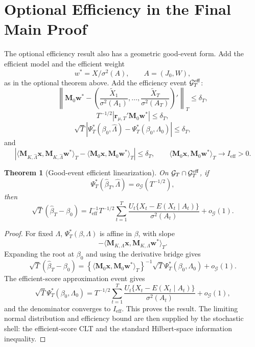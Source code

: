 \documentclass[12pt]{article}
\numberwithin{equation}{section}
\newtheorem{theorem}{Theorem}
\theoremstyle{definition}
\newcommand{\innerT}[2]{\langle #1,#2\rangle_T}
\begin{document}
\section{Optional Efficiency in the Final Main Proof}

The optional efficiency result also has a geometric good-event form. Add the
efficient model and the efficient weight
\[
    w^*=X/\sigma^2(A),
    \qquad A=(J_0,W),
\]
as in the optional theorem above. Add the efficiency event \(\mathcal G_T^{\rm eff}\):
\[
    \left\|\bm M_0\bm w^*-
    \left(\frac{\widetilde X_1}{\sigma^2(A_1)},\ldots,
          \frac{\widetilde X_T}{\sigma^2(A_T)}\right)'\right\|_T
    \le\delta_T,
\]
\[
    T^{-1/2}|\bm r_{\mu,T}'\bm M_0\bm w^*|\le\delta_T,
\]
\[
    \sqrt T|\Psi_T^*(\beta_0,\widehat\Lambda)
      -\Psi_T^*(\beta_0,\Lambda_0)|\le\delta_T,
\]
and
\[
    \left|\innerT{\bm M_{K,\widehat\Lambda}\bm x}
      {\bm M_{K,\widehat\Lambda}\bm w^*}
      -\innerT{\bm M_0\bm x}{\bm M_0\bm w^*}\right|\le\delta_T,
    \qquad
    \innerT{\bm M_0\bm x}{\bm M_0\bm w^*}\to I_{\mathrm{eff}}>0.
\]

\begin{theorem}[Good-event efficient linearization]
\label{thm:v2-good-event-efficiency}
On \(\mathcal G_T\cap\mathcal G_T^{\rm eff}\), if
\[
    \Psi_T^*(\widehat\beta_T,\widehat\Lambda)=o_{\mathcal G}(T^{-1/2}),
\]
then
\[
    \sqrt T(\widehat\beta_T-\beta_0)
    =I_{\mathrm{eff}}^{-1}
      T^{-1/2}\sum_{t=1}^T
      \frac{U_t\{X_t-E(X_t\mid A_t)\}}{\sigma^2(A_t)}
      +o_{\mathcal G}(1).
\]
\end{theorem}

\begin{proof}
For fixed \(\Lambda\), \(\Psi_T^*(\beta,\Lambda)\) is affine in \(\beta\), with
slope
\[
    -\innerT{\bm M_{K,\Lambda}\bm x}{\bm M_{K,\Lambda}\bm w^*}.
\]
Expanding the root at \(\beta_0\) and using the derivative bridge gives
\[
    \sqrt T(\widehat\beta_T-\beta_0)
    =\left\{\innerT{\bm M_0\bm x}{\bm M_0\bm w^*}\right\}^{-1}
      \sqrt T\Psi_T^*(\beta_0,\Lambda_0)+o_{\mathcal G}(1).
\]
The efficient-score approximation event gives
\[
    \sqrt T\Psi_T^*(\beta_0,\Lambda_0)
    =T^{-1/2}\sum_{t=1}^T
      \frac{U_t\{X_t-E(X_t\mid A_t)\}}{\sigma^2(A_t)}+o_{\mathcal G}(1),
\]
and the denominator converges to \(I_{\mathrm{eff}}\). This proves the result.
The limiting normal distribution and efficiency bound are then supplied by the
stochastic shell: the efficient-score CLT and the standard Hilbert-space
information inequality.
\end{proof}
\end{document}
